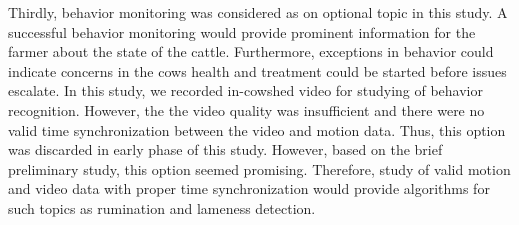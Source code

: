 \documentclass[english,12pt,a4paper,pdftex,elec,utf8]{aaltothesis}
\begin{document}
Thirdly, behavior monitoring was considered as on optional topic in this study. A successful behavior monitoring would provide prominent information for the farmer about the state of the cattle. Furthermore, exceptions in behavior could indicate concerns in the cows health and treatment could be started before issues escalate. In this study, we recorded in-cowshed video for studying of behavior recognition. However, the the video quality was insufficient and there were no valid time synchronization between the video and motion data. Thus, this option was discarded in early phase of this study. However, based on the brief preliminary study, this option seemed promising. Therefore, study of valid motion and video data with proper time synchronization would provide algorithms for such topics as rumination and lameness detection.


\clearpage





\clearpage

\thesisbibliography

%



\printbibliography




\clearpage

\thesisappendix

%
\end{document}
